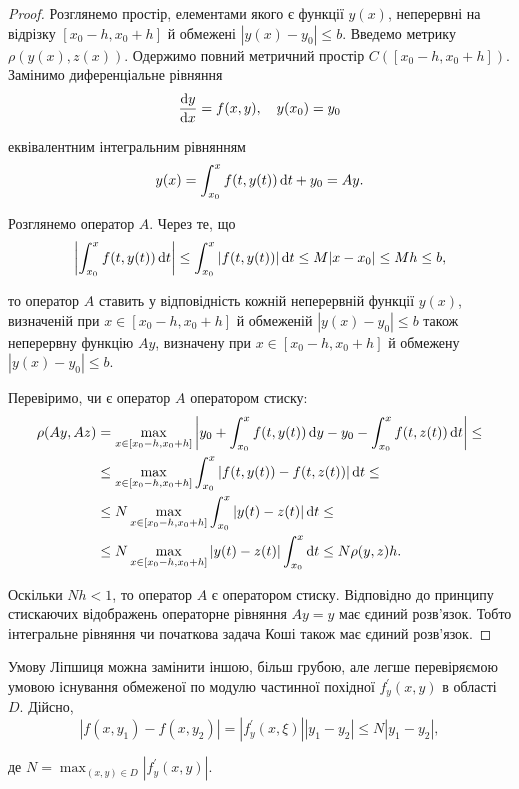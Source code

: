 \begin{proof}
	Розглянемо простір, елементами якого є функції $y(x)$, неперервні на відрізку $[x_0 - h, x_0 + h]$ й обмежені $|y(x) - y_0| \le b$. Введемо метрику $\rho(y(x), z(x))$. Одержимо повний метричний простір $C([x_0 - h, x_0 + h])$. Замінимо диференціальне рівняння
	\begin{equation*}
		\frac{\mathop{}\!\mathrm{d} y}{\mathop{}\!\mathrm{d} x} = f(x, y), \quad y(x_0) = y_0
	\end{equation*}

	еквівалентним інтегральним рівнянням
	\begin{equation*}
		y(x) = \int_{x_0}^x f(t, y(t)) \mathop{}\!\mathrm{d} t + y_0 = A y.
	\end{equation*}
	
	Розглянемо оператор $A$. Через те, що 
	\begin{equation*}
		\left|\int_{x_0}^x f(t, y(t)) \mathop{}\!\mathrm{d} t \right| \le \int_{x_0}^x |f(t, y(t))| \mathop{}\!\mathrm{d} t \le M |x-x_0| \le Mh \le b,
	\end{equation*}

	то оператор $A$ ставить у відповідність кожній неперервній функції $y(x)$, визначеній при $x\in[x_0 - h, x_0 + h]$ й обмеженій $|y(x)-y_0|\le b$ також неперервну функцію $Ay$, визначену при $x\in[x_0 - h, x_0 + h]$ й обмежену $|y(x)-y_0|\le b$. \parvskip

	Перевіримо, чи є оператор $A$ оператором стиску:
	\begin{align*}
		\rho(Ay, Az) &= \max_{x \in[x_0-h,x_0+h]} \left|y_0 + \int_{x_0}^x f(t, y(t)) \mathop{}\!\mathrm{d} y - y_0 - \int_{x_0}^x f(t, z(t)) \mathop{}\!\mathrm{d} t\right| \le \\
		&\le \max_{x \in[x_0-h,x_0+h]} \int_{x_0}^x |f(t, y(t)) - f(t, z(t))| \mathop{}\!\mathrm{d} t \le \\
		&\le N \max_{x \in[x_0-h,x_0+h]} \int_{x_0}^x |y(t) - z(t)| \mathop{}\!\mathrm{d} t \le \\
		&\le N \max_{x \in[x_0-h,x_0+h]} |y(t) - z(t)| \int_{x_0}^x \mathop{}\!\mathrm{d} t \le N \rho(y, z) h.
	\end{align*}

	Оскільки $Nh < 1$, то оператор $A$ є оператором стиску. Відповідно до принципу стискаючих відображень операторне рівняння $Ay=y$ має єдиний розв'язок. Тобто інтегральне рівняння чи початкова задача Коші також має єдиний роз\-в'яз\-ок.
\end{proof}

\begin{remark}
	Умову Ліпшиця можна замінити іншою, більш грубою, але легше перевіряємою умовою існування обмеженої по модулю частинної похідної $f_y^\prime (x,y)$ в області $D$. Дійсно,
	\begin{equation*}
		|f(x,y_1)-f(x,y_2)|=|f_y^\prime(x,\xi)||y_1-y_2|\le N|y_1-y_2|,
	\end{equation*}

	де $N = \max_{(x,y)\in D} |f_y^\prime(x,y)|$.
\end{remark}

